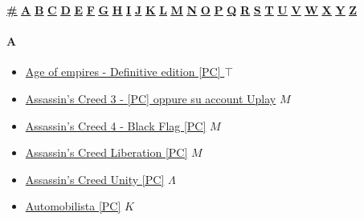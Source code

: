 

	 \begin{center}
	\hyperlink{G\#}{\textbf{\underline{\#}}}
	\hyperlink{GA}{\textbf{\underline{A}}} \hyperlink{GB}{\textbf{\underline{B}}} \hyperlink{GC}{\textbf{\underline{C}}} \hyperlink{GD}{\textbf{\underline{D}}} \hyperlink{GE}{\textbf{\underline{E}}} \hyperlink{GF}{\textbf{\underline{F}}} \hyperlink{GG}{\textbf{\underline{G}}} \hyperlink{GH}{\textbf{\underline{H}}} \hyperlink{GI}{\textbf{\underline{I}}} \hyperlink{GJ}{\textbf{\underline{J}}} \hyperlink{GK}{\textbf{\underline{K}}} \hyperlink{GL}{\textbf{\underline{L}}} \hyperlink{GM}{\textbf{\underline{M}}} \hyperlink{GN}{\textbf{\underline{N}}} \hyperlink{GO}{\textbf{\underline{O}}} \hyperlink{GP}{\textbf{\underline{P}}} \hyperlink{GQ}{\textbf{\underline{Q}}} \hyperlink{GR}{\textbf{\underline{R}}} \hyperlink{GS}{\textbf{\underline{S}}} \hyperlink{GT}{\textbf{\underline{T}}} \hyperlink{GU}{\textbf{\underline{U}}} \hyperlink{GV}{\textbf{\underline{V}}} \hyperlink{GW}{\textbf{\underline{W}}} \hyperlink{GX}{\textbf{\underline{X}}} \hyperlink{GY}{\textbf{\underline{Y}}} \hyperlink{GZ}{\textbf{\underline{Z}}}
\end{center}
		\paragraph{A} \hypertarget{GA}{}
			\begin{itemize}
				
				\item \href{https://mega.nz/#!fbJ20BpA!2SZkigRzuN2Uozq0o7z8xntJ0vYxtINMSkfcpEJPnPQ} {Age of empires - Definitive edition [PC] } $\top$ \\
				\item \href{https://mega.nz/#F!EvwVVIyT!meh3YMAK4WLeT2pgupzSkQ} {Assassin's Creed 3 - [PC] oppure su account Uplay} $M$ \\
				\item \href{https://mega.nz/#!B6ZXmZ6Z!nwCWQRLtgcrPiwhhXpI15ITxtvsnV3tumo3PnK2Wsyc} {Assassin's Creed 4 - Black Flag [PC]} $M$ \\
				\item \href{https://mega.nz/#F!M7oB1Tqb!ILer0gY9LYDKm6A6O1HRzw} {Assassin's Creed Liberation [PC]} $M$ \\
				\item \href{https://mega.nz/#!I6pwhLBB!CogE5GjnaZN_-ILgg4MozJTOJxRSrmsJZoFobpKE904} {Assassin's Creed Unity [PC]} $\Lambda$ \\
				\item \href{https://mega.nz/#F!yxsi2SbQ!nl06bJ3VrjBWbIjruQvuGg} {Automobilista [PC]} $K$ \\ 
				
				
				
			\end{itemize}	
